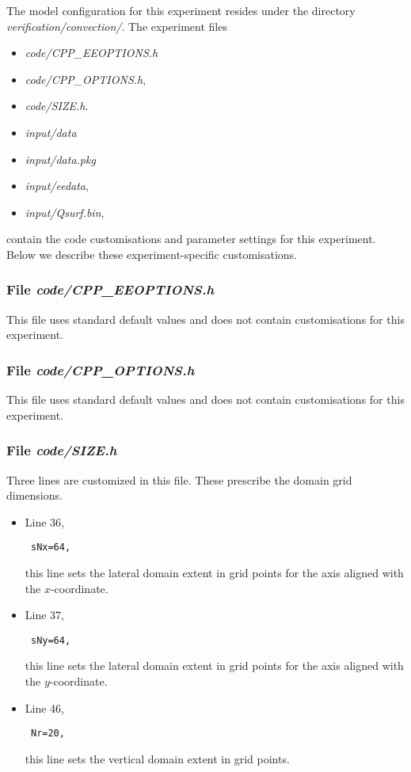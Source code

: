 The model configuration for this experiment resides under the directory
{\it verification/convection/}. The experiment files
\begin{itemize}
\item {\it code/CPP\_EEOPTIONS.h}
\item {\it code/CPP\_OPTIONS.h},
\item {\it code/SIZE.h}. 
\item {\it input/data}
\item {\it input/data.pkg}
\item {\it input/eedata},
\item {\it input/Qsurf.bin},
\end{itemize}
contain the code customisations and parameter settings for this 
experiment. Below we describe these experiment-specific customisations.

\subsubsection{File {\it code/CPP\_EEOPTIONS.h}}

This file uses standard default values and does not contain
customisations for this experiment.

\subsubsection{File {\it code/CPP\_OPTIONS.h}}

This file uses standard default values and does not contain
customisations for this experiment.

\subsubsection{File {\it code/SIZE.h}}

Three lines are customized in this file. These prescribe the domain grid dimensions.
\begin{itemize}

\item Line 36, 
\begin{verbatim} sNx=64, \end{verbatim} this line sets
the lateral domain extent in grid points for the
axis aligned with the $x$-coordinate.

\item Line 37, 
\begin{verbatim} sNy=64, \end{verbatim} this line sets
the lateral domain extent in grid points for the
axis aligned with the $y$-coordinate.

\item Line 46, 
\begin{verbatim} Nr=20,   \end{verbatim} this line sets
the vertical domain extent in grid points.

\end{itemize}

